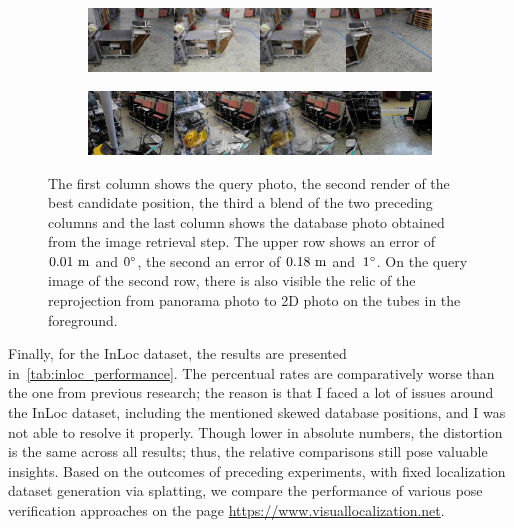 \begin{figure}
    \centering
    \begin{subfigure}{.95\textwidth}
          \centering
       \includegraphics[width=.95\textwidth]{../graphics/err_0.01m_0deg_results_q_id_3_best_db_1}
    \end{subfigure}%

    \begin{subfigure}[width=.95\textwidth]{.95\textwidth}
          \centering
          \includegraphics[width=.95\textwidth]{../graphics/err_0.18m_1deg_results_q_id_137_best_db_1}
    \end{subfigure}
    \caption[Sample localization visualizations]{The first column shows the
    query photo, the second render of the best candidate position, the third
    a blend of the two preceding columns and the last column shows the
    database photo obtained from the image retrieval step. The upper row
    shows an error of $0.01~\mathrm{m}$ and $0^{\circ}$, the second an error of $0.18~\mathrm{m}$
    and~$1^{\circ}$. On the query image of the second row, there is also visible
    the relic of the reprojection from panorama photo to 2D photo on the tubes
    in the foreground.
    }\label{fig:artwin_loc}
\end{figure}





Finally, for the InLoc dataset, the results are presented
in~\cref{tab:inloc_performance}. The percentual rates are comparatively
worse than the one from previous research; the reason is that I faced
a lot of issues around the InLoc dataset, including the mentioned skewed
database positions, and I was not able to resolve it properly.
Though lower in absolute numbers, the distortion is the same across
all results; thus, the relative comparisons still pose valuable insights.
Based on the outcomes of preceding experiments, with fixed localization
dataset generation via splatting, we compare the performance of various
pose verification approaches on the page \url{https://www.visuallocalization.net}.

